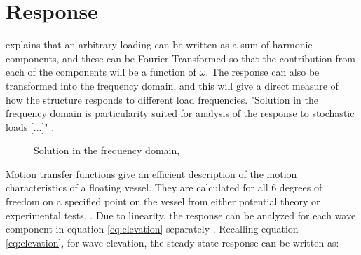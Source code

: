 \section{Response}
\cite{Langen1999} explains that an arbitrary loading can be written as a sum of harmonic components, and these can be Fourier-Transformed so that the contribution from each of the components will be a function of $\omega$. The response can also be transformed into the frequency domain, and this will give a direct measure of how the structure responds to different load frequencies. "Solution in the frequency domain is particularity suited for analysis of the response to stochastic loads [...]" \cite{Langen1999}. 
 
\begin{figure}[H]
\hfill
{}\hfill
  \hfill
\caption[$\; \:$Solution in the frequency domain]{Solution in the frequency domain, \cite{Langen1999}}
\label{fig:transex}
\end{figure}

\noindent Motion transfer functions give an efficient description of the motion characteristics of a floating vessel. They are calculated for all 6 degrees of freedom on a specified point on the vessel from either potential theory or experimental tests. \cite{sintef2017}. Due to linearity, the response can be analyzed for each wave component in equation \ref{eq:elevation} separately \cite{Faltinsen1990}. Recalling equation \ref{eq:elevation}, for wave elevation, the steady state response can be written as:

